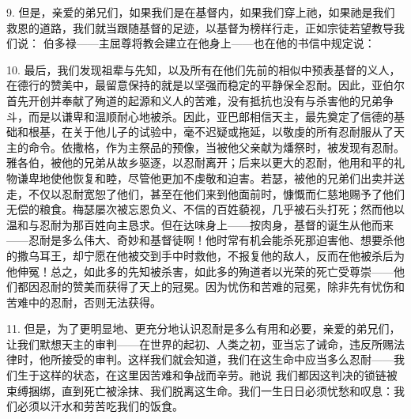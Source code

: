 9. 但是，亲爱的弟兄们，如果我们是在基督内，如果我们穿上祂，如果祂是我们救恩的道路，我们就当跟随基督的足迹，以基督为榜样行走，正如宗徒若望教导我们说：  伯多禄——主屈尊将教会建立在他身上——也在他的书信中规定说：\par

10. 最后，我们发现祖辈与先知，以及所有在他们先前的相似中预表基督的义人，在德行的赞美中，最留意保持的就是以坚强而稳定的平静保全忍耐。因此，亚伯尔首先开创并奉献了殉道的起源和义人的苦难，没有抵抗也没有与杀害他的兄弟争斗，而是以谦卑和温顺耐心地被杀。因此，亚巴郎相信天主，最先奠定了信德的基础和根基，在关于他儿子的试验中，毫不迟疑或拖延，以敬虔的所有忍耐服从了天主的命令。依撒格，作为主祭品的预像，当被他父亲献为燔祭时，被发现有忍耐。雅各伯，被他的兄弟从故乡驱逐，以忍耐离开；后来以更大的忍耐，他用和平的礼物谦卑地使他恢复和睦，尽管他更加不虔敬和迫害。若瑟，被他的兄弟们出卖并送走，不仅以忍耐宽恕了他们，甚至在他们来到他面前时，慷慨而仁慈地赐予了他们无偿的粮食。梅瑟屡次被忘恩负义、不信的百姓藐视，几乎被石头打死；然而他以温和与忍耐为那百姓向主恳求。但在达味身上——按肉身，基督的诞生从他而来——忍耐是多么伟大、奇妙和基督徒啊！他时常有机会能杀死那迫害他、想要杀他的撒乌耳王，却宁愿在他被交到手中时救他，不报复他的敌人，反而在他被杀后为他伸冤！总之，如此多的先知被杀害，如此多的殉道者以光荣的死亡受尊崇——他们都因忍耐的赞美而获得了天上的冠冕。因为忧伤和苦难的冠冕，除非先有忧伤和苦难中的忍耐，否则无法获得。\par

11. 但是，为了更明显地、更充分地认识忍耐是多么有用和必要，亲爱的弟兄们，让我们默想天主的审判——在世界的起初、人类之初，亚当忘了诫命，违反所赐法律时，他所接受的审判。这样我们就会知道，我们在这生命中应当多么忍耐——我们生于这样的状态，在这里因苦难和争战而辛劳。祂说  我们都因这判决的锁链被束缚捆绑，直到死亡被涂抹、我们脱离这生命。我们一生日日必须忧愁和叹息：我们必须以汗水和劳苦吃我们的饭食。\par

